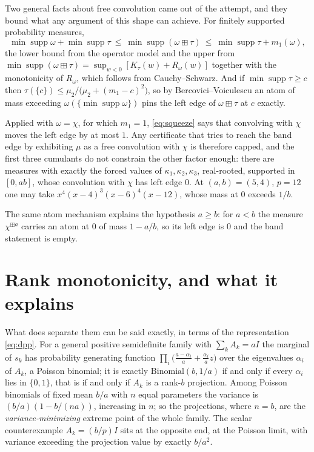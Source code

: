 \documentclass[11pt]{article}
\theoremstyle{remark}
\begin{document}
Two general facts about free convolution came out of the attempt, and they bound
what any argument of this shape can achieve. For finitely supported probability
measures,
\begin{equation}\label{eq:squeeze}
\min\operatorname{supp}\omega+\min\operatorname{supp}\tau
\ \le\ \min\operatorname{supp}(\omega\boxplus\tau)
\ \le\ \min\operatorname{supp}\tau+m_1(\omega),
\end{equation}
the lower bound from the operator model and the upper from
$\min\operatorname{supp}(\omega\boxplus\tau)=\sup_{w<0}[K_\tau(w)+R_\omega(w)]$
together with the monotonicity of $R_\omega$, which follows from Cauchy--Schwarz.
And if $\min\operatorname{supp}\tau\ge c$ then
$\tau(\{c\})\le\mu_2/\bigl(\mu_2+(m_1-c)^2\bigr)$, so by Bercovici--Voiculescu an
atom of mass exceeding $\omega(\{\min\operatorname{supp}\omega\})$ pins the left
edge of $\omega\boxplus\tau$ at $c$ exactly.

Applied with $\omega=\chi$, for which $m_1=1$, \eqref{eq:squeeze} says that
convolving with $\chi$ moves the left edge by at most $1$. Any certificate that
tries to reach the band edge by exhibiting $\mu$ as a free convolution with $\chi$
is therefore capped, and the first three cumulants do not constrain the other
factor enough: there are measures with exactly the forced values of
$\kappa_1,\kappa_2,\kappa_3$, real-rooted, supported in $[0,ab]$, whose convolution
with $\chi$ has left edge $0$. At $(a,b)=(5,4)$, $p=12$ one may take
$x^4(x-4)^3(x-6)^4(x-12)$, whose mass at $0$ exceeds $1/b$.

The same atom mechanism explains the hypothesis $a\ge b$: for $a<b$ the measure
$\chi^{\boxplus a}$ carries an atom at $0$ of mass $1-a/b$, so its left edge is $0$
and the band statement is empty.

\section{Rank monotonicity, and what it explains}\label{sec:rank}

What does separate them can be said exactly, in terms of the representation
\eqref{eq:dpp}. For a general positive semidefinite family with $\sum_kA_k=aI$ the
marginal of $s_k$ has probability generating function
$\prod_i\bigl(\tfrac{a-\alpha_i}{a}+\tfrac{\alpha_i}{a}z\bigr)$ over the eigenvalues
$\alpha_i$ of $A_k$, a Poisson binomial; it is exactly $\mathrm{Binomial}(b,1/a)$ if
and only if every $\alpha_i$ lies in $\{0,1\}$, that is if and only if $A_k$ is a
rank-$b$ projection. Among Poisson binomials of fixed mean $b/a$ with $n$ equal
parameters the variance is $(b/a)(1-b/(na))$, increasing in $n$; so the projections,
where $n=b$, are the \emph{variance-minimizing} extreme point of the whole family.
The scalar counterexample $A_k=(b/p)I$ sits at the opposite end, at the Poisson
limit, with variance exceeding the projection value by exactly $b/a^2$.
\end{document}
